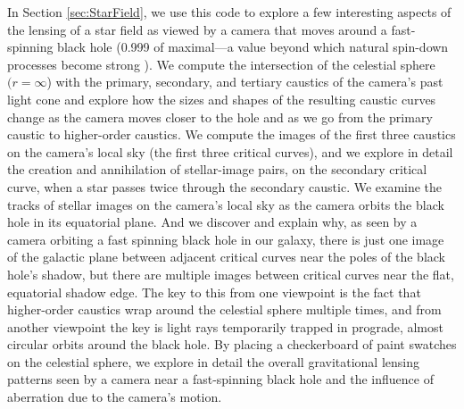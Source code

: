 \documentclass[12pt]{iopart}
\begin{document}
In Section \ref{sec:StarField}, we use this code to explore a few interesting aspects of the 
lensing of a star field as viewed by a camera that moves around a fast-spinning black hole (0.999 of maximal---a value beyond which natural spin-down processes
become strong \cite{KipSpinDown}).  
We compute the intersection of the celestial sphere $(r=\infty$) with the primary, secondary, and tertiary caustics of the camera's past light cone and explore how the sizes and shapes of the resulting caustic curves change as the camera moves closer to the hole and as we go from the primary
caustic to higher-order caustics.  We compute the images of the first three caustics on the camera's
local sky (the first three critical curves), and we explore in detail the creation
and annihilation of stellar-image pairs, on the secondary critical curve, when a star passes 
twice through the secondary caustic.  We examine the tracks of stellar images on
the camera's local sky as the camera orbits the black hole in its equatorial plane.  
And we discover and explain why, as seen by a camera orbiting a fast spinning
black hole in
our galaxy, there is just one image of the galactic plane between adjacent critical
curves near the poles of the black hole's shadow, but there are multiple images between critical curves
near the flat, equatorial shadow edge.  The key to this from one viewpoint is the fact that higher-order caustics wrap around the celestial sphere multiple times, and from another viewpoint the key is light rays temporarily trapped
in prograde, almost circular orbits around the black hole.  By placing a checkerboard of paint swatches on the celestial sphere, we  explore in detail the overall gravitational lensing patterns seen by a camera near a fast-spinning black hole and the influence of aberration due to the camera's motion.
\end{document}

